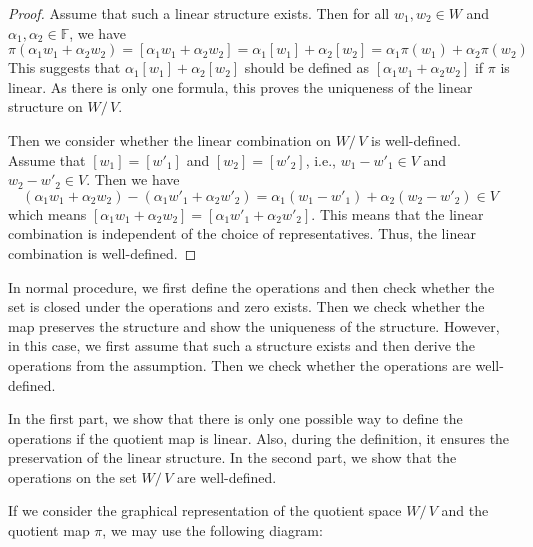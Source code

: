 \documentclass[
	11pt, %
	fleqn, %
	a4paper, %
]{LegrandOrangeBook}
\newcommand{\quotient}[2]{#1/\, #2} %
\newcommand{\F}{\mathbb{F}} %
\begin{document}
\begin{proof}
    Assume that such a linear structure exists. Then for all $w_1, w_2 \in W$ and $\alpha_1, \alpha_2 \in \F$, we have
    \[
        \pi(\alpha_1 w_1 + \alpha_2 w_2) = [\alpha_1 w_1 + \alpha_2 w_2] = \alpha_1 [w_1] + \alpha_2 [w_2] = \alpha_1 \pi(w_1) + \alpha_2 \pi(w_2)
    \]
    This suggests that $\alpha_1 [w_1] + \alpha_2 [w_2]$ should be defined as $[\alpha_1 w_1 + \alpha_2 w_2]$ if $\pi$ is linear. As there is only one formula, this proves the uniqueness of the linear structure on $\quotient{W}{V}$.

    Then we consider whether the linear combination on $\quotient{W}{V}$ is well-defined. Assume that $[w_1] = [w'_1]$ and $[w_2] = [w'_2]$, i.e., $w_1 - w'_1 \in V$ and $w_2 - w'_2 \in V$. Then we have
    \[
        (\alpha_1 w_1 + \alpha_2 w_2) - (\alpha_1 w'_1 + \alpha_2 w'_2) = \alpha_1 (w_1 - w'_1) + \alpha_2 (w_2 - w'_2) \in V
    \]
    which means $[\alpha_1 w_1 + \alpha_2 w_2] = [\alpha_1 w'_1 + \alpha_2 w'_2]$. This means that the linear combination is independent of the choice of representatives. Thus, the linear combination is well-defined.
\end{proof}

In normal procedure, we first define the operations and then check whether the set is closed under the operations and zero exists. Then we check whether the map preserves the structure and show the uniqueness of the structure. However, in this case, we first assume that such a structure exists and then derive the operations from the assumption. Then we check whether the operations are well-defined.

In the first part, we show that there is only one possible way to define the operations if the quotient map is linear. Also, during the definition, it ensures the preservation of the linear structure. In the second part, we show that the operations on the set $\quotient{W}{V}$ are well-defined.

If we consider the graphical representation of the quotient space $\quotient{W}{V}$ and the quotient map $\pi$, we may use the following diagram:
\end{document}
